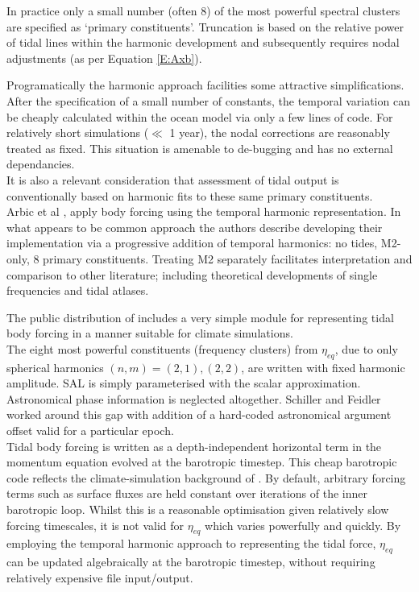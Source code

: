 In practice only a small number (often 8) of the most powerful spectral clusters are specified as `primary constituents'.  
Truncation is based on the relative power of tidal lines within the harmonic development and subsequently requires nodal adjustments (as per Equation \ref{E:Axb}).

Programatically the harmonic approach facilities some attractive simplifications.  
After the specification of a small number of constants, the temporal variation can be cheaply calculated within the ocean model via only a few lines of code.   
For relatively short simulations ($\ll$ 1 year), the nodal corrections are reasonably treated as fixed.   This situation is amenable to de-bugging and has no external dependancies.\\
It is also a relevant consideration that assessment of tidal output is conventionally based on harmonic fits to these same primary constituents.\\

Arbic et al \citep{Arbic:2010us}, apply body forcing using the temporal harmonic representation.  In what appears to be common approach the authors describe developing their implementation via a progressive addition of temporal harmonics: no tides, M2-only, 8 primary constituents.  Treating M2 separately facilitates interpretation and comparison to other literature; including theoretical developments of single frequencies and tidal atlases.



The public distribution of \MOM{} includes a very simple module for representing tidal body forcing in a manner suitable for climate simulations\cite[pp263] {Griffies:2008vh}.\\
The eight most powerful constituents (frequency clusters) from $\eta_{eq}$, due to only spherical harmonics $(n,m) = (2,1) , (2,2)$, are written with fixed harmonic amplitude.  SAL is simply parameterised with the scalar approximation. \\
Astronomical phase information is neglected altogether.
Schiller and Feidler \citep{Schiller:2007gk} worked around this gap with addition of a hard-coded astronomical argument offset valid for a particular epoch.\\
Tidal body forcing is written as a depth-independent horizontal term in the momentum equation evolved at the barotropic timestep.
This cheap barotropic code reflects the climate-simulation background of \MOM{}.  
By default, arbitrary forcing terms such as surface fluxes are held constant over iterations of the inner barotropic loop.  
Whilst this is a reasonable optimisation given relatively slow forcing timescales, it is not valid for $\eta_{eq}$ which varies powerfully and quickly.
By employing the temporal harmonic approach to representing the tidal force, $\eta_{eq}$ can be updated algebraically at the barotropic timestep, without requiring relatively expensive file input/output.\\




